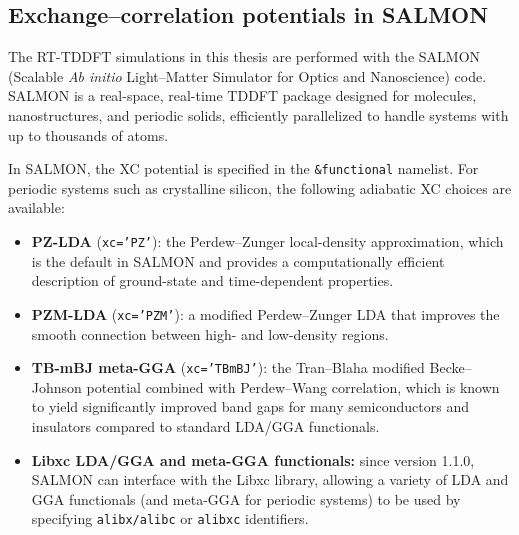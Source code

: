
\subsection{Exchange--correlation potentials in SALMON}

The RT-TDDFT simulations in this thesis are performed with the SALMON (Scalable \textit{Ab initio} Light--Matter Simulator for Optics and Nanoscience) code.\cite{Noda2019}
SALMON is a real-space, real-time TDDFT package designed for molecules, nanostructures, and periodic solids, efficiently parallelized to handle systems with up to thousands of atoms.\cite{Noda2019}

In SALMON, the XC potential is specified in the \texttt{\&functional} namelist.\cite{SALMONmanual}
For periodic systems such as crystalline silicon, the following adiabatic XC choices are available:

\begin{itemize}
  \item \textbf{PZ-LDA} (\texttt{xc='PZ'}): the Perdew--Zunger local-density approximation,\cite{SALMONmanual} which is the default in SALMON and provides a computationally efficient description of ground-state and time-dependent properties.

  \item \textbf{PZM-LDA} (\texttt{xc='PZM'}): a modified Perdew--Zunger LDA that improves the smooth connection between high- and low-density regions.\cite{SALMONmanual}

  \item \textbf{TB-mBJ meta-GGA} (\texttt{xc='TBmBJ'}): the Tran--Blaha modified Becke--Johnson potential combined with Perdew--Wang correlation,\cite{SALMONmanual} which is known to yield significantly improved band gaps for many semiconductors and insulators compared to standard LDA/GGA functionals.

  \item \textbf{Libxc LDA/GGA and meta-GGA functionals:} since version 1.1.0, SALMON can interface with the Libxc library, allowing a variety of LDA and GGA functionals (and meta-GGA for periodic systems) to be used by specifying \texttt{alibx/alibc} or \texttt{alibxc} identifiers.\cite{SALMONmanual}
\end{itemize}

